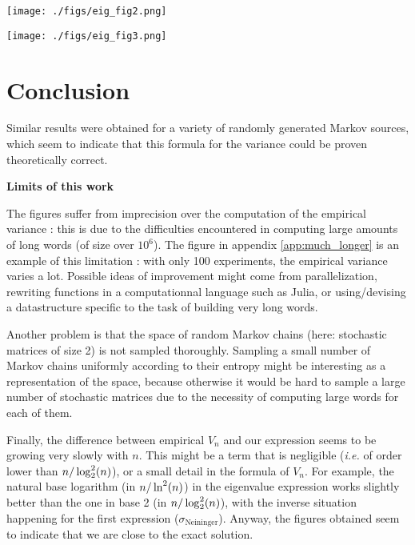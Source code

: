 \noindent
 	 \begin{minipage}{\textwidth}
        \texttt{[image: ./figs/eig\_fig2.png]}	
	\end{minipage} 

\noindent
 	 \begin{minipage}{\textwidth}
        \texttt{[image: ./figs/eig\_fig3.png]}	
	\end{minipage} 


\section{Conclusion}
Similar results were obtained for a variety of randomly generated Markov sources,
which seem to indicate that this formula for the variance could be proven theoretically
correct. 

\begin{remarque}
\noindent \textbf{Limits of this work}


The figures suffer from imprecision over the computation of the empirical 
variance : this is due to the difficulties encountered in computing large amounts
of long words (of size over $10^6$). The figure in appendix \ref{app:much_longer} is 
an example of this limitation : with only 100 experiments, the empirical variance 
varies a lot. Possible ideas of improvement might come from parallelization,
rewriting functions in a computationnal language such as Julia, or using/devising a datastructure
specific to the task of building very long words.

Another problem is that the space of random Markov chains (here: stochastic matrices
of size 2) is not sampled thoroughly. Sampling a small number of Markov chains uniformly
according to their entropy might be interesting as a representation of the space,
 because otherwise it would be hard to sample a large number of stochastic matrices
due to the necessity of computing large words for each of them.

Finally, the difference between empirical $V_n$ and our expression seems to be growing
very slowly with $n$. This might be a term that is negligible (\textit{i.e.} of 
order lower than $n/\log_2^2(n)$), or a small detail in the formula of $V_n$. 
For example, the natural base logarithm (in $n/\ln^2(n)$) in the eigenvalue expression works slightly
better than the one in base 2 (in $n/\log_2^2(n)$), with the inverse situation happening for the first 
expression ($\sigma_{\text{Neininger}}$). Anyway, the figures obtained seem to 
indicate that we are close to the exact solution.

\end{remarque}


